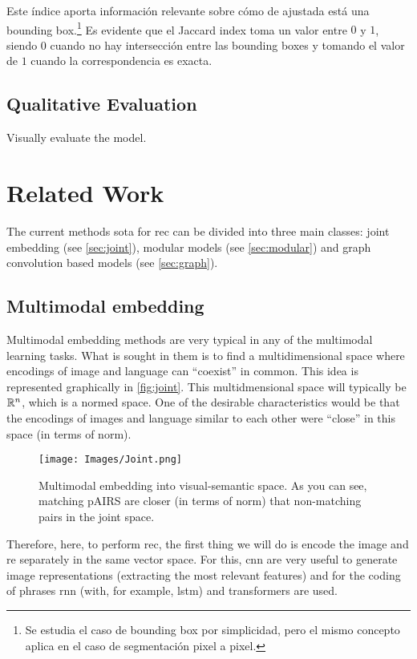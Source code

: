 Este índice aporta información relevante sobre cómo de ajustada está una
bounding box.\footnote{Se estudia el caso de bounding box por simplicidad, pero
  el mismo concepto aplica en el caso de segmentación pixel a pixel.} Es
evidente que el Jaccard index toma un valor entre \(0\) y \(1\), siendo \(0\)
cuando no hay intersección entre las bounding boxes y tomando el valor de \(1\)
cuando la correspondencia es exacta.


\subsection{Qualitative Evaluation}

Visually evaluate the model.


\section{Related Work} \label{sec:sota}

The current methods \gls{sota} for \gls{rec} can be divided into three main
classes: joint embedding (see \vref{sec:joint}), modular models (see
\vref{sec:modular}) and graph convolution based models (see \vref{sec:graph}).

\subsection{Multimodal embedding}%
\label{sec:joint}
Multimodal embedding methods are very typical in any of the multimodal learning
tasks. What is sought in them is to find a multidimensional space where
encodings of image and language can ``coexist'' in common. This idea is
represented graphically in \vref{fig:joint}. This multidmensional space will
typically be \(\mathbb{R}^n\), which is a normed space. One of the desirable
characteristics would be that the encodings of images and language similar to
each other were ``close'' in this space (in terms of norm).

\begin{figure}[htb]
  \centering
  \texttt{[image: Images/Joint.png]}
  \caption[Multimodal embedding technique]{Multimodal embedding into
    visual-semantic space. As you can see, matching pAIRS are closer (in terms
    of norm) that non-matching pairs in the joint space.}
  \label{fig:joint}
\end{figure}

Therefore, here, to perform \gls{rec}, the first thing we will do is encode the
image and \gls{re} separately in the same vector space. For this, \gls{cnn} are
very useful to generate image representations (extracting the most relevant
features) and for the coding of phrases \gls{rnn} (with, for example,
\gls{lstm}) and transformers are used.

